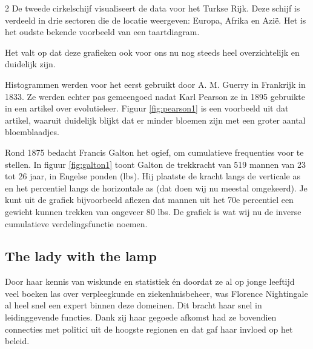 \begin{multicols}{2}
 De tweede cirkelschijf visualiseert de data voor het Turkse Rijk. Deze schijf is verdeeld in drie sectoren die de locatie weergeven: Europa, Afrika en Azië. Het is het oudste bekende voorbeeld van een taartdiagram.
	
	
	Het valt op dat deze grafieken ook voor ons nu nog steeds heel overzichtelijk en duidelijk zijn.
	
	Histogrammen werden voor het eerst gebruikt door A. M. Guerry in Frankrijk in 1833. Ze werden echter pas gemeengoed nadat Karl Pearson ze in 1895 gebruikte in een artikel over evolutieleer. Figuur \ref{fig:pearson1} is een voorbeeld uit dat artikel, waaruit duidelijk blijkt dat er minder bloemen zijn met een groter aantal bloemblaadjes.
	
	Rond 1875 bedacht Francis Galton het ogief, om cumulatieve frequenties voor te stellen. In figuur \ref{fig:galton1} toont Galton de trekkracht van 519 mannen van 23 tot 26 jaar, in Engelse ponden (lbs). Hij plaatste de kracht langs de verticale as en het percentiel langs de horizontale as (dat doen wij nu meestal omgekeerd). Je kunt uit de grafiek bijvoorbeeld aflezen dat mannen uit het 70e percentiel een gewicht kunnen trekken van ongeveer 80 lbs. De grafiek is wat wij nu de inverse cumulatieve verdelingsfunctie noemen.
	
	\subsection*{The lady with the lamp}
	
	Door haar kennis van wiskunde en statistiek én doordat ze al op jonge leeftijd veel boeken las over verpleegkunde en ziekenhuisbeheer, was Florence Nightingale al heel snel een expert binnen deze domeinen. Dit bracht haar snel in leidinggevende functies. Dank zij haar gegoede afkomst had ze bovendien connecties met politici uit de hoogste regionen en dat gaf haar invloed op het beleid.
	

\end{multicols}
